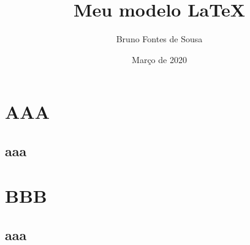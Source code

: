 \documentclass{article}
\begin{document}
  \title{Meu modelo LaTeX} %
  \author{Bruno Fontes de Sousa} %
  \date{Março de 2020} %
  
  \maketitle            %
  \thispagestyle{empty} %
  \newpage              %

  \setcounter{page}{1}  %
  \tableofcontents      %
  \newpage              %

  \setcounter{page}{1}  %
  
  \section{AAA} %
    \lipsum[1-5]
    \subsection{aaa} %
      \lipsum[2-5]
  \section{BBB} %
    \lipsum[1-4]
    \subsection{aaa} %
      \lipsum[3-5]

\end{document}

